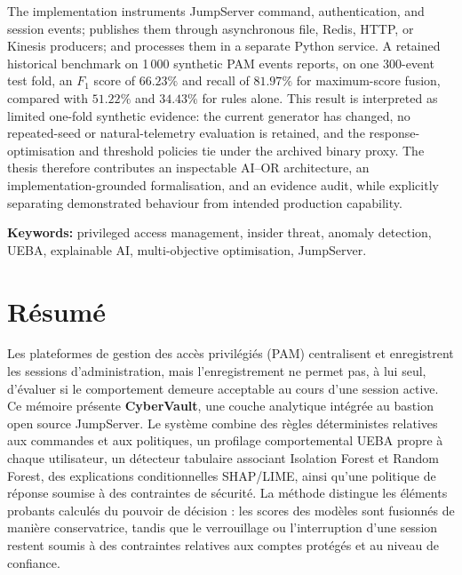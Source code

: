 \documentclass[11pt,a4paper,oneside]{report}
\theoremstyle{definition}
\theoremstyle{plain}
\begin{document}
The implementation instruments JumpServer command, authentication, and session events; publishes them through asynchronous file, Redis, HTTP, or Kinesis producers; and processes them in a separate Python service. A retained historical benchmark on 1\,000 synthetic PAM events reports, on one 300-event test fold, an $F_1$ score of $66.23\%$ and recall of $81.97\%$ for maximum-score fusion, compared with $51.22\%$ and $34.43\%$ for rules alone. This result is interpreted as limited one-fold synthetic evidence: the current generator has changed, no repeated-seed or natural-telemetry evaluation is retained, and the response-optimisation and threshold policies tie under the archived binary proxy. The thesis therefore contributes an inspectable AI--OR architecture, an implementation-grounded formalisation, and an evidence audit, while explicitly separating demonstrated behaviour from intended production capability.

\medskip
\noindent\textbf{Keywords:} privileged access management, insider threat, anomaly detection, UEBA, explainable AI, multi-objective optimisation, JumpServer.

\chapter*{Résumé}
Les plateformes de gestion des accès privilégiés (PAM) centralisent et enregistrent les sessions d'administration, mais l'enregistrement ne permet pas, à lui seul, d'évaluer si le comportement demeure acceptable au cours d'une session active. Ce mémoire présente \textbf{CyberVault}, une couche analytique intégrée au bastion open source JumpServer. Le système combine des règles déterministes relatives aux commandes et aux politiques, un profilage comportemental UEBA propre à chaque utilisateur, un détecteur tabulaire associant Isolation Forest et Random Forest, des explications conditionnelles SHAP/LIME, ainsi qu'une politique de réponse soumise à des contraintes de sécurité. La méthode distingue les éléments probants calculés du pouvoir de décision : les scores des modèles sont fusionnés de manière conservatrice, tandis que le verrouillage ou l'interruption d'une session restent soumis à des contraintes relatives aux comptes protégés et au niveau de confiance.
\end{document}
